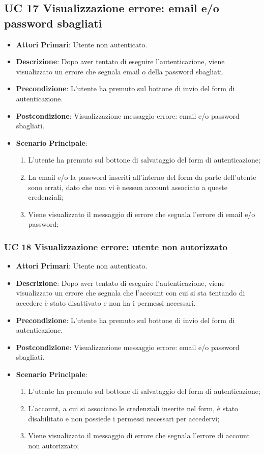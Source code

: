 		\subsection{UC 17 Visualizzazione errore: email e/o password sbagliati}
		\begin{itemize}
			\item \textbf{Attori Primari}: Utente non autenticato.
			\item \textbf{Descrizione}: Dopo aver tentato di eseguire l'autenticazione, viene visualizzato un errore che segnala email o della password sbagliati.
			\item \textbf{Precondizione}: L'utente ha premuto sul bottone di invio del form di autenticazione.
			\item \textbf{Postcondizione}: Visualizzazione messaggio errore: email e/o password sbagliati.
			\item \textbf{Scenario Principale}:
			\begin{enumerate}
				\item L'utente ha premuto sul bottone di salvataggio del form  di autenticazione;
				\item La email e/o la password inseriti all'interno del form da parte dell'utente sono errati, dato che non vi è nessun account associato a queste credenziali;
				\item Viene visualizzato il messaggio di errore che segnala l'errore di email e/o password;
			\end{enumerate}
		\end{itemize}


		\subsubsection{UC 18 Visualizzazione errore: utente non autorizzato}
		\begin{itemize}
			\item \textbf{Attori Primari}: Utente non autenticato.
			\item \textbf{Descrizione}: Dopo aver tentato di eseguire l'autenticazione, viene visualizzato un errore che segnala che l'account con cui si sta tentando di accedere è stato disattivato e non ha i permessi necessari.
			\item \textbf{Precondizione}: L'utente ha premuto sul bottone di invio del form di autenticazione.
			\item \textbf{Postcondizione}: Visualizzazione messaggio errore: email e/o password sbagliati.
			\item \textbf{Scenario Principale}:
			\begin{enumerate}
				\item L'utente ha premuto sul bottone di salvataggio del form di autenticazione;
				\item L'account, a cui si associano le credenziali inserite nel form, è stato disabilitato e non possiede i permessi necessari per accedervi;
				\item Viene visualizzato il messaggio di errore che segnala l'errore di account non autorizzato;
			\end{enumerate}
		\end{itemize}

